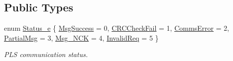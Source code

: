 \subsection*{Public Types}
\begin{DoxyCompactItemize}
\item 
enum \mbox{\hyperlink{class_c_p_l_s_comms_a765bc36363f75f4faf4fd2b41d440159}{Status\+\_\+e}} \{ \newline
\mbox{\hyperlink{class_c_p_l_s_comms_a765bc36363f75f4faf4fd2b41d440159ae570dcdfbc45793ba4555a0affd13537}{Msg\+Success}} = 0, 
\mbox{\hyperlink{class_c_p_l_s_comms_a765bc36363f75f4faf4fd2b41d440159a864f2f53e22e459265224c734bb9dd68}{C\+R\+C\+Check\+Fail}} = 1, 
\mbox{\hyperlink{class_c_p_l_s_comms_a765bc36363f75f4faf4fd2b41d440159a25bac8413bc8ba52e18e0f1fd1f95ce3}{Comms\+Error}} = 2, 
\mbox{\hyperlink{class_c_p_l_s_comms_a765bc36363f75f4faf4fd2b41d440159a0b65dd788672e08b0ef59cbf76955d81}{Partial\+Msg}} = 3, 
\newline
\mbox{\hyperlink{class_c_p_l_s_comms_a765bc36363f75f4faf4fd2b41d440159a97259eab94ba1eeb5d236afd0bb9c01b}{Msg\+\_\+\+N\+CK}} = 4, 
\mbox{\hyperlink{class_c_p_l_s_comms_a765bc36363f75f4faf4fd2b41d440159ada559acd2007e11466d7e8e461f9bd10}{Invalid\+Req}} = 5
 \}
\begin{DoxyCompactList}\small\item\em P\+LS communication status. \end{DoxyCompactList}\end{DoxyCompactItemize}
